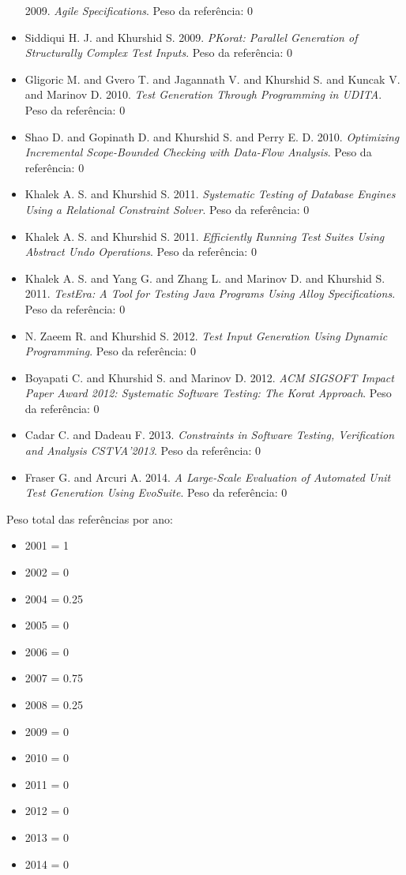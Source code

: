 \begin{itemize}
      2009.
      {\it Agile Specifications}.
      Peso da referência: 0
\item Siddiqui H. J. and Khurshid S.
      2009.
      {\it PKorat: Parallel Generation of Structurally Complex Test Inputs}.
      Peso da referência: 0
\item Gligoric M. and Gvero T. and Jagannath V. and Khurshid S. and Kuncak V. and Marinov D.
      2010.
      {\it Test Generation Through Programming in UDITA}.
      Peso da referência: 0
\item Shao D. and Gopinath D. and Khurshid S. and Perry E. D.
      2010.
      {\it Optimizing Incremental Scope-Bounded Checking with Data-Flow Analysis}.
      Peso da referência: 0
\item Khalek A. S. and Khurshid S.
      2011.
      {\it Systematic Testing of Database Engines Using a Relational Constraint Solver}.
      Peso da referência: 0
\item Khalek A. S. and Khurshid S.
      2011.
      {\it Efficiently Running Test Suites Using Abstract Undo Operations}.
      Peso da referência: 0
\item Khalek A. S. and Yang G. and Zhang L. and Marinov D. and Khurshid S.
      2011.
      {\it TestEra: A Tool for Testing Java Programs Using Alloy Specifications}.
      Peso da referência: 0
\item N. Zaeem R. and Khurshid S.
      2012.
      {\it Test Input Generation Using Dynamic Programming}.
      Peso da referência: 0
\item Boyapati C. and Khurshid S. and Marinov D.
      2012.
      {\it ACM SIGSOFT Impact Paper Award 2012: Systematic Software Testing: The Korat Approach}.
      Peso da referência: 0
\item Cadar C. and Dadeau F.
      2013.
      {\it Constraints in Software Testing, Verification and Analysis CSTVA'2013}.
      Peso da referência: 0
\item Fraser G. and Arcuri A.
      2014.
      {\it A Large-Scale Evaluation of Automated Unit Test Generation Using EvoSuite}.
      Peso da referência: 0
\end{itemize}

Peso total das referências por ano:

\begin{itemize}
\item 2001 = 1
\item 2002 = 0
\item 2004 = 0.25
\item 2005 = 0
\item 2006 = 0
\item 2007 = 0.75
\item 2008 = 0.25
\item 2009 = 0
\item 2010 = 0
\item 2011 = 0
\item 2012 = 0
\item 2013 = 0
\item 2014 = 0
\end{itemize}


